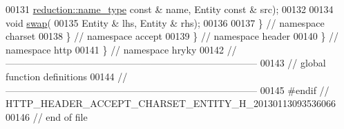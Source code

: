 \begin{DoxyCode}
00131         \hyperlink{namespacehryky_1_1reduction_ac686c30a4c8d196bbd0f05629a6b921f}{reduction::name_type} \textcolor{keyword}{const} & name, Entity \textcolor{keyword}{const} & src);
00132 
00134     \textcolor{keywordtype}{void} \hyperlink{namespacehryky_1_1http_a38e62595ad532d18fbc65ceb61973aec}{swap}(
00135         Entity & lhs, Entity & rhs);
00136 
00137 \} \textcolor{comment}{// namespace charset}
00138 \} \textcolor{comment}{// namespace accept}
00139 \} \textcolor{comment}{// namespace header}
00140 \} \textcolor{comment}{// namespace http}
00141 \} \textcolor{comment}{// namespace hryky}
00142 \textcolor{comment}{//
      ------------------------------------------------------------------------------}
00143 \textcolor{comment}{// global function definitions}
00144 \textcolor{comment}{//
      ------------------------------------------------------------------------------}
00145 \textcolor{preprocessor}{#endif // HTTP\_HEADER\_ACCEPT\_CHARSET\_ENTITY\_H\_20130113093536066}
00146 \textcolor{preprocessor}{}\textcolor{comment}{// end of file}
\end{DoxyCode}
